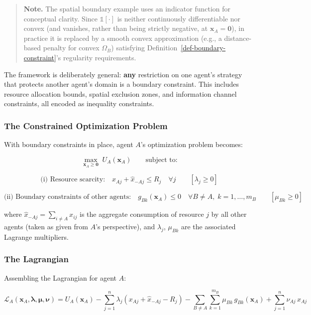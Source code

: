 \documentclass[11pt]{article}
\theoremstyle{plain}
\theoremstyle{definition}
\theoremstyle{remark}
\let\origsubsubsection\subsubsection
\renewcommand{\subsubsection}{\needspace{4\baselineskip}\origsubsubsection}
\begin{document}
\begin{quote}
\textbf{Note.} The spatial boundary example uses an indicator function
for conceptual clarity. Since \(\mathds{1}[\cdot]\) is neither
continuously differentiable nor convex (and vanishes, rather than being
strictly negative, at \(\mathbf{x}_A = \mathbf{0}\)), in practice it is
replaced by a smooth convex approximation (e.g., a distance-based
penalty for convex \(\Omega_B\)) satisfying
Definition~\ref{def-boundary-constraint}'s regularity requirements.
\end{quote}

The framework is deliberately general: \textbf{any} restriction on one
agent's strategy that protects another agent's domain is a boundary
constraint. This includes resource allocation bounds, spatial exclusion
zones, and information channel constraints, all encoded as inequality
constraints.

\subsubsection{The Constrained Optimization
Problem}\label{the-constrained-optimization-problem}

With boundary constraints in place, agent \(A\)'s optimization problem
becomes:

\[\max_{\mathbf{x}_A \geq \mathbf{0}} \; U_A(\mathbf{x}_A) \qquad \text{subject to:}\]

\[\text{(i) Resource scarcity:} \quad x_{Aj} + \hat{x}_{-Aj} \leq R_j \quad \forall j \qquad [\lambda_j \geq 0]\]

\[\text{(ii) Boundary constraints of other agents:} \quad g_{Bk}(\mathbf{x}_A) \leq 0 \quad \forall B \neq A, \; k = 1, \ldots, m_B \qquad [\mu_{Bk} \geq 0]\]

where \(\hat{x}_{-Aj} = \sum_{i \neq A} x_{ij}\) is the aggregate
consumption of resource \(j\) by all other agents (taken as given from
\(A\)'s perspective), and \(\lambda_j\), \(\mu_{Bk}\) are the associated
Lagrange multipliers.

\subsubsection{The Lagrangian}\label{the-lagrangian}

Assembling the Lagrangian for agent \(A\):

\[\mathcal{L}_A(\mathbf{x}_A, \boldsymbol{\lambda}, \boldsymbol{\mu}, \boldsymbol{\nu}) = U_A(\mathbf{x}_A) - \sum_{j=1}^{n} \lambda_j \left( x_{Aj} + \hat{x}_{-Aj} - R_j \right) - \sum_{B \neq A} \sum_{k=1}^{m_B} \mu_{Bk} \, g_{Bk}(\mathbf{x}_A) + \sum_{j=1}^{n} \nu_{Aj} \, x_{Aj}\]
\end{document}
